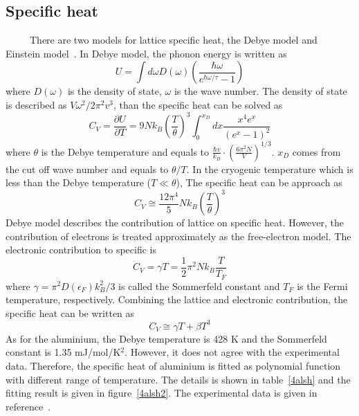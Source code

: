 \subsection{Specific heat}
~~~~~There are two models for lattice specific heat, the Debye model and Einstein model~\cite{kittle}.
In Debye model, the phonon energy is written as
\begin{equation}
 U = \int d\omega D(\omega) (\frac{\hbar \omega}{e^{\hbar \omega / \tau}-1})
\end{equation}
where $D(\omega)$ is the density of state, $\omega$ is the wave number.
The density of state is described as $V\omega^2/2\pi^2v^3$, than the specific heat can be solved as
\begin{equation}
 C_V = \frac{\partial U}{\partial T} = 9 N k_B (\frac{T}{\theta})^3 \int^{x_D}_{0} dx \frac{x^4 e^x}{(e^x-1)^2}
\end{equation}
where $\theta$ is the Debye temperature and equals to $\frac{\hbar v}{k_B} \cdot (\frac{6\pi^2 N}{V})^{1/3}$.
$x_D$ comes from the cut off wave number and equals to $\theta/T$.
In the cryogenic temperature which is less than the Debye temperature ($T\ll\theta$), The specific heat can be approach as
\begin{equation}
 C_V \cong \frac{12 \pi^4}{5} N k_B (\frac{T}{\theta})^3
\end{equation}
Debye model describes the contribution of lattice on specific heat.
However, the contribution of electrons is treated approximately as the free-electron model.
The electronic contribution to specific is
\begin{equation}
 C_V = \gamma T = \frac{1}{2} \pi^2 N k_B \frac{T}{T_F}
\end{equation}
where $\gamma = \pi^2 D(\epsilon_F)k_B^2/3$ is called the Sommerfeld constant and $T_F$ is the Fermi temperature, respectively.
Combining the lattice and electronic contribution, the specific heat can be written as
\begin{equation}
 C_V \cong \gamma T + \beta T^3
\end{equation}
As for the aluminium, the Debye temperature is 428 K and the Sommerfeld constant is 1.35 mJ/mol/K$^2$.
However, it does not agree with the experimental data.
Therefore, the specific heat of aluminium is fitted as polynomial function with different range of temperature.
The details is shown in table~\ref{4alsh} and the fitting result is given in figure~\ref{4alsh2}.
The experimental data is given in reference~\cite{aldata}.
